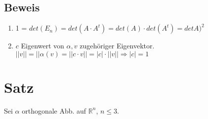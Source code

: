 \documentclass[a4paper, openany]{book}
\begin{document}
        \subsection{Beweis}

        \begin{enumerate}[label=(\alph*)]
          \item 1 = $det(E_n) = det(A \cdot A^t) = det(A) \cdot det(A^t) = detA)^2$

          \item $c$ Eigenwert von $\alpha, v$ zugehöriger Eigenvektor. $||v|| = ||\alpha(v) = || c \cdot v|| = |c| \cdot ||v|| \Rightarrow |c| = 1$

        \end{enumerate}

        \section{Satz}

        Sei $\alpha$ orthogonale Abb. auf $\mathbb{R}^n$, $n \le 3$.
\end{document}
